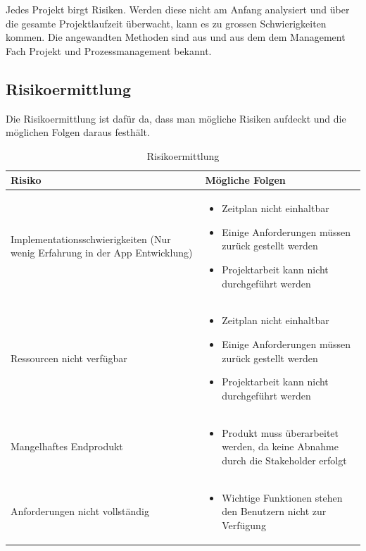 Jedes Projekt birgt Risiken. Werden diese nicht am Anfang analysiert und über die gesamte Projektlaufzeit überwacht, kann es zu grossen Schwierigkeiten kommen. Die angewandten Methoden sind aus \cite{proj_mgmt_book} und aus dem dem Management Fach Projekt und Prozessmanagement bekannt.

\subsection{Risikoermittlung}\label{risikoermittlung}
Die Risikoermittlung ist dafür da, dass man mögliche Risiken aufdeckt und die möglichen Folgen daraus festhält.

\begin{table}[ht]
\centering
  \begin{tabular}{  p{5cm} | p{9cm} }
	\hline
	\rowcolor{gray}
	Risiko							&	Mögliche Folgen	\\ \hline
	Implementationsschwierigkeiten (Nur wenig Erfahrung in der App Entwicklung)
								&	\begin{itemize}
										\item Zeitplan nicht einhaltbar
										\item Einige Anforderungen müssen zurück gestellt werden
										\item Projektarbeit kann nicht durchgeführt werden
									\end{itemize}	\\ \hline
	Ressourcen nicht verfügbar
								&	\begin{itemize}
										\item Zeitplan nicht einhaltbar
										\item Einige Anforderungen müssen zurück gestellt werden
										\item Projektarbeit kann nicht durchgeführt werden
									\end{itemize}	\\ \hline
	Mangelhaftes Endprodukt		
								&	\begin{itemize}
										\item Produkt muss überarbeitet werden, da keine Abnahme durch die Stakeholder erfolgt
									\end{itemize}	\\ \hline	
	Anforderungen nicht vollständig	
								&	\begin{itemize}
										\item Wichtige Funktionen stehen den Benutzern nicht zur Verfügung
									\end{itemize}	\\ \hline			
  \end{tabular}
   \caption{Risikoermittlung}
\end{table}

